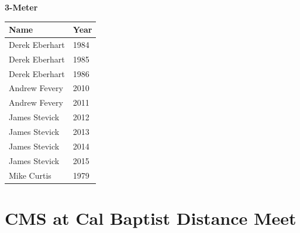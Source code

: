 \vspace{1.2em}
\noindent\begin{minipage}[t]{0.98\textwidth}
\centering
\textbf{\textcolor{teamprimary}{3-Meter}}\par
\vspace{0.5em}
\centering
\small
\renewcommand{\arraystretch}{1.0}
\setlength{\tabcolsep}{4pt}
\begin{tabular}{@{}p{3.0cm}p{1.0cm}@{}}
\toprule
\textbf{Name} & \textbf{Year} \\
\midrule
Derek Eberhart & 1984 \\
Derek Eberhart & 1985 \\
Derek Eberhart & 1986 \\
Andrew Fevery & 2010 \\
Andrew Fevery & 2011 \\
James Stevick & 2012 \\
James Stevick & 2013 \\
James Stevick & 2014 \\
James Stevick & 2015 \\
Mike Curtis & 1979 \\
\bottomrule
\end{tabular}
\end{minipage}
\vspace{-0.5em}
\clearpage
\section{CMS at Cal Baptist Distance Meet}
\clearpage

